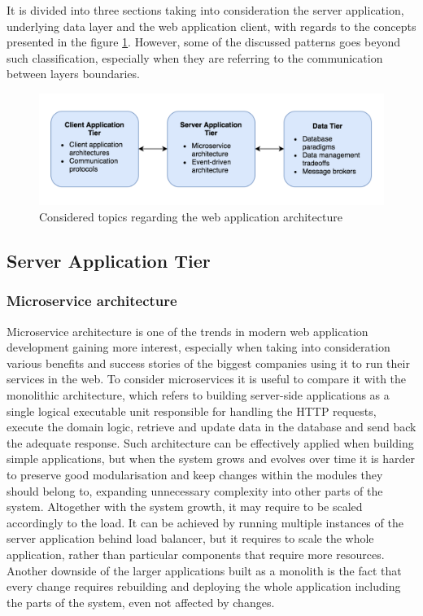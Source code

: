 It is divided into three sections taking into consideration the server application, underlying data layer and the web application client, with regards to the concepts presented in the figure \ref{fig:web-app-architecture-concepts}. However, some of the discussed patterns goes beyond such classification, especially when they are referring to the communication between layers boundaries.

\begin{figure}[h]
    \centering
    \includegraphics[width=1\textwidth]{assets/03-web-applications/WebAppLayers.png}
    \caption{Considered topics regarding the web application architecture}
    \label{fig:web-app-architecture-concepts}
\end{figure}

\subsection{Server Application Tier}

\subsubsection{Microservice architecture}

Microservice architecture is one of the trends in modern web application development gaining more interest, especially when taking into consideration various benefits and success stories of the biggest companies using it to run their services in the web. To consider microservices it is useful to compare it with the monolithic architecture, which refers to building server-side applications as a single logical executable unit responsible for handling the HTTP requests, execute the domain logic, retrieve and update data in the database and send back the adequate response. Such architecture can be effectively applied when building simple applications, but when the system grows and evolves over time it is harder to preserve good modularisation and keep changes within the modules they should belong to, expanding unnecessary complexity into other parts of the system. Altogether with the system growth, it may require to be scaled accordingly to the load. It can be achieved by running multiple instances of the server application behind load balancer, but it requires to scale the whole application, rather than particular components that require more resources. Another downside of the larger applications built as a monolith is the fact that every change requires rebuilding and deploying the whole application including the parts of the system, even not affected by changes.

